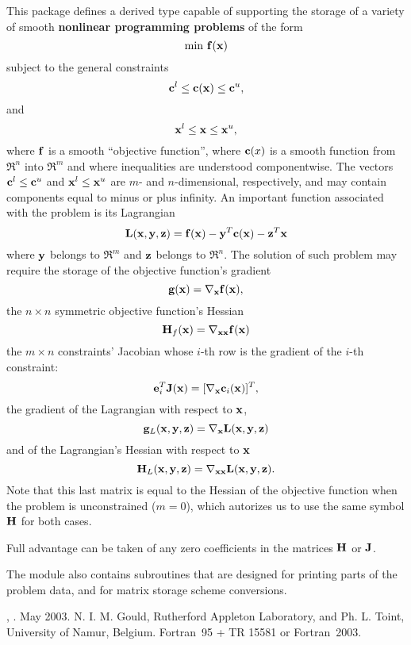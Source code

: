 \documentclass{galahad}
\newcommand{\packagename}{NLPT}
\newcommand{\fullpackagename}{\libraryname\_\packagename}
\begin{document}
\galheader


\galsummary
This package defines a derived type capable of supporting the storage of
a variety of smooth {\bf nonlinear programming problems} of the form
\[
\min \, {\mathbf{f}}({\mathbf{x}})
\]
subject to the general constraints
\[
{\mathbf{c}}^l \leq {\mathbf{c}}({\mathbf{x}}) \leq {\mathbf{c}}^u,
\]
and
\[
{\mathbf{x}}^l \leq {\mathbf{x}} \leq {\mathbf{x}}^u,
\]
where ${\mathbf{f}}$ is a smooth ``objective function'', where ${\mathbf{c}}(x)$ is a smooth
function from $\Re^n$ into $\Re^m$ and where inequalities are understood
componentwise. The vectors ${\mathbf{c}}^l \leq {\mathbf{c}}^u$ and ${\mathbf{x}}^l \leq {\mathbf{x}}^u$ are
$m$- and $n$-dimensional, respectively, and may contain components equal to
minus or plus infinity. An important function associated with the problem
is its Lagrangian
\[
{\mathbf{L}}( {\mathbf{x}},{\mathbf{y}}, {\mathbf{z}}) = {\mathbf{f}}({\mathbf{x}}) - {\mathbf{y}}^T{\mathbf{c}}({\mathbf{x}}) - {\mathbf{z}}^T{\mathbf{x}}
\]
where ${\mathbf{y}}$ belongs to $\Re^m$ and ${\mathbf{z}}$ belongs to $\Re^n$.
The solution of such problem may require the storage of the objective
function's gradient
\[
{\mathbf{g}}({\mathbf{x}}) = \nabla_{{\mathbf{x}}} {\mathbf{f}}({\mathbf{x}}),
\]
the $n \times n$ symmetric objective function's Hessian
\[
{\mathbf{H}}_f({\mathbf{x}}) = \nabla_{{\mathbf{x}}{\mathbf{x}}} {\mathbf{f}}({\mathbf{x}})
\]
the $m \times n$ constraints' Jacobian whose $i$-th row is the
gradient of the $i$-th constraint:
\[
{\mathbf{e}}_i^T {\mathbf{J}}({\mathbf{x}}) = [ \nabla_{{\mathbf{x}}} {\mathbf{c}}_i({\mathbf{x}}) ]^T,
\]
the gradient of the Lagrangian with respect to ${\mathbf{x}}$,
\[
{\mathbf{g}}_L({\mathbf{x}},{\mathbf{y}},{\mathbf{z}}) = \nabla_{{\mathbf{x}}} {\mathbf{L}}( {\mathbf{x}},{\mathbf{y}}, {\mathbf{z}})
\]
and of the Lagrangian's Hessian with respect to ${\mathbf{x}}$
\[
{\mathbf{H}}_L({\mathbf{x}},{\mathbf{y}},{\mathbf{z}}) = \nabla_{{\mathbf{x}}{\mathbf{x}}} {\mathbf{L}}( {\mathbf{x}},{\mathbf{y}}, {\mathbf{z}}).
\]
Note that this last matrix is equal to the Hessian of the objective function
when the problem is unconstrained ($m=0$), which autorizes us
to use the same symbol ${\mathbf{H}}$ for both cases.

\noindent
Full advantage can be taken of any zero coefficients in the matrices ${\mathbf{H}}$
or ${\mathbf{J}}$.

\noindent
The module also contains subroutines that are designed for printing parts
of the problem data, and for matrix storage scheme conversions.


\galattributes
\galversions{\tt  \fullpackagename\_single, \fullpackagename\_double},
.
\galdate May 2003.
\galorigin N. I. M. Gould, Rutherford Appleton Laboratory, and
Ph. L. Toint, University of Namur, Belgium.
\gallanguage Fortran~95 + TR 15581 or Fortran~2003.
\end{document}
